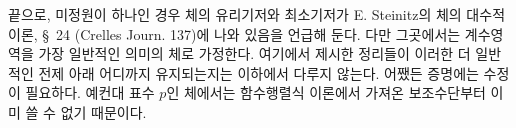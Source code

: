 
끝으로, 미정원이 하나인 경우 체의 유리기저와 최소기저가 E. Steinitz의 \glqq{}체의 대수적 이론\grqq{}, \S\ 24 (Crelles Journ. 137)에 나와 있음을 언급해 둔다. 다만 그곳에서는 계수영역을 가장 일반적인 의미의 체로 가정한다. 여기에서 제시한 정리들이 이러한 더 일반적인 전제 아래 어디까지 유지되는지는 이하에서 다루지 않는다. 어쨌든 증명에는 수정이 필요하다. 예컨대 표수 $p$인 체에서는 함수행렬식 이론에서 가져온 보조수단부터 이미 쓸 수 없기 때문이다.
